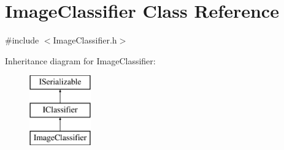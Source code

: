 \hypertarget{class_image_classifier}{}\section{Image\+Classifier Class Reference}
\label{class_image_classifier}


{\ttfamily \#include $<$Image\+Classifier.\+h$>$}

Inheritance diagram for Image\+Classifier\+:\begin{figure}[H]
\begin{center}
\leavevmode
\includegraphics[height=3.000000cm]{class_image_classifier}
\end{center}
\end{figure}
